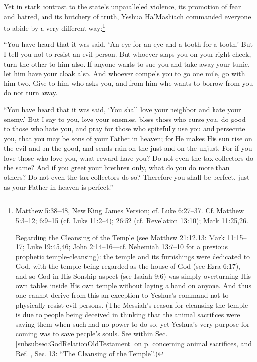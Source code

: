 \documentclass[letterpaper,12pt]{article}
\newenvironment{squotation}
  {\small\quotation}
  {\endquotation\normalsize}
\begin{document}
Yet in stark contrast to the state's unparalleled violence, its promotion of fear and hatred, and its butchery of truth, Yeshua Ha'Mashiach commanded everyone to abide by a very different way:\footnote{Matthew 5:38--48, New King James Version; cf. Luke 6:27--37. Cf. Matthew 5:3--12; 6:9--15 (cf. Luke 11:2--4); 26:52 (cf. Revelation 13:10); Mark 11:25,26.\par
    Regarding\label{CleansingOfTheTemple} the Cleansing of the Temple (see Matthew 21:12,13; Mark 11:15--17; Luke 19:45,46; John 2:14--16---cf. Nehemiah 13:7--10 for a previous prophetic temple-cleansing): the temple and its furnishings were dedicated to God, with the temple being regarded as the house of God (see Ezra 6:17), and so God in His Sonship aspect (see Isaiah 9:6) was simply overturning His own tables inside His own temple without laying a hand on anyone. And thus one cannot derive from this an exception to Yeshua's command not to physically resist evil persons. (The Messiah's reason for cleansing the temple is due to people being deceived in thinking that the animal sacrifices were saving them when such had no power to do so, yet Yeshua's very purpose for coming was to save people's souls. See within Sec. \ref{subsubsec:GodRelationOldTestament} on p. \pageref{AnimalSacrifices} concerning animal sacrifices, and Ref. , Sec. 13: ``The Cleansing of the Temple''.)}

\begin{squotation}
``You have heard that it was said, `An eye for an eye and a tooth for a tooth.' But I tell you not to resist an evil person. But whoever slaps you on your right cheek, turn the other to him also. If anyone wants to sue you and take away your tunic, let him have your cloak also. And whoever compels you to go one mile, go with him two. Give to him who asks you, and from him who wants to borrow from you do not turn away.

``You have heard that it was said, `You shall love your neighbor and hate your enemy.' But I say to you, love your enemies, bless those who curse you, do good to those who hate you, and pray for those who spitefully use you and persecute you, that you may be sons of your Father in heaven; for He makes His sun rise on the evil and on the good, and sends rain on the just and on the unjust. For if you love those who love you, what reward have you? Do not even the tax collectors do the same? And if you greet your brethren only, what do you do more than others? Do not even the tax collectors do so? Therefore you shall be perfect, just as your Father in heaven is perfect.''
\end{squotation}
\end{document}
